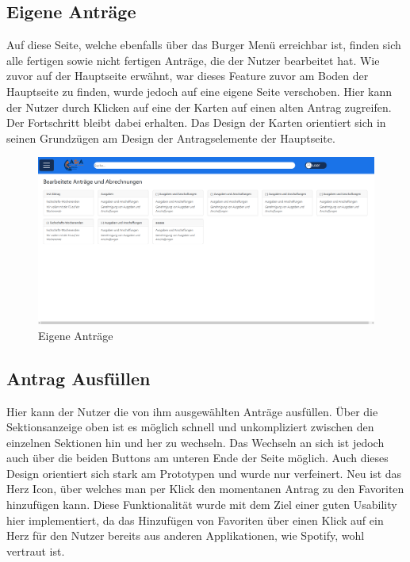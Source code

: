 \pagebreak

\subsection{Eigene Anträge}\label{Eigene Anträge}

Auf diese Seite, welche ebenfalls über das Burger Menü erreichbar ist, finden sich alle
fertigen sowie nicht fertigen Anträge, die der Nutzer bearbeitet hat. Wie zuvor auf der Hauptseite erwähnt, war dieses Feature zuvor am Boden der Hauptseite zu finden, wurde
jedoch auf eine eigene Seite verschoben. Hier kann der Nutzer durch Klicken auf eine der
Karten auf einen alten Antrag zugreifen. Der Fortschritt bleibt dabei erhalten. Das Design
der Karten orientiert sich in seinen Grundzügen am Design der Antragselemente der
Hauptseite.

\begin{figure}[h]
\centering
\includegraphics[width=1.0\textwidth]{Doc/images/Own Antraege.png}
\caption{Eigene Anträge}\label{Eigene Daten}
\end{figure}

\pagebreak

\subsection{Antrag Ausfüllen}\label{Antrag Ausfüllen}

Hier kann der Nutzer die von ihm ausgewählten Anträge ausfüllen. Über die Sektionsanzeige
oben ist es möglich schnell und unkompliziert zwischen den einzelnen Sektionen hin und her
zu wechseln. Das Wechseln an sich ist jedoch auch über die beiden Buttons am unteren Ende
der Seite möglich. Auch dieses Design orientiert sich stark am Prototypen und wurde nur
verfeinert. Neu ist das Herz Icon, über welches man per Klick den momentanen Antrag zu den
Favoriten hinzufügen kann. Diese Funktionalität wurde mit dem Ziel einer guten Usability
hier implementiert, da das Hinzufügen von Favoriten über einen Klick auf ein Herz für
den Nutzer bereits aus anderen Applikationen, wie Spotify, wohl vertraut ist.

